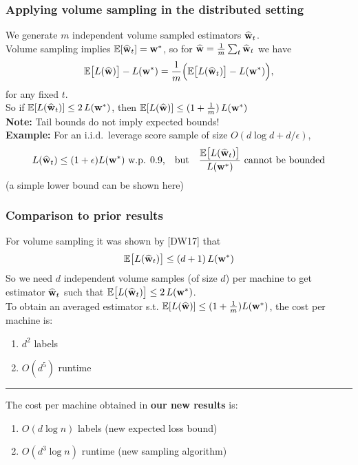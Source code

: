 \documentclass{beamer}
\begin{document}
\begin{frame}
  \frametitle{Applying volume sampling in the distributed setting}
  We generate $m$ independent volume sampled estimators $\widehat{\mathbf w}_t$.\\
Volume sampling implies $\mathbb E[\widehat{\mathbf w}_t] = \mathbf w^*$, so for $\widehat{\mathbf w} =
  \frac1m\sum_t\widehat{\mathbf w}_t$ we have
  \begin{align*}
    \mathbb E\big[L(\widehat{\mathbf w})\big] -L(\mathbf w^*) = \frac1m\Big(\mathbb E\big[L(\widehat{\mathbf w}_t)\big]
    - L(\mathbf w^*)\Big),
  \end{align*}
  for any fixed $t$.\\[2mm]
  So if $\mathbb E[L(\widehat{\mathbf w}_t)]\leq 2\,L(\mathbf w^*)$, then $\mathbb E[L(\widehat{\mathbf w})]\leq
  (1+\frac1m)\,L(\mathbf w^*)$\\[5mm]
  
  \textbf{Note:} Tail bounds do not imply expected bounds!\\
  \textbf{Example:} For an i.i.d.~leverage score sample of size
  $O(d\log d+d/\epsilon)$, 
  \begin{align*}
L(\widehat{\mathbf w}_t)\leq (1+\epsilon) L(\mathbf w^*)\text{ w.p. 0.9,\quad but}\quad
    \frac{\mathbb E\big[L(\widehat{\mathbf w}_t)\big]}{L(\mathbf w^*)} \text{ cannot be bounded}
  \end{align*}
  (a simple lower bound can be shown here)
\end{frame}

\begin{frame}
  \frametitle{Comparison to prior results}
  For volume sampling it was shown by [DW17] that
  \begin{align*}
    \mathbb E\big[L(\widehat{\mathbf w}_t)\big]\leq (d+1)\,L(\mathbf w^*)
  \end{align*}
So we need $d$ independent volume samples (of size $d$) per machine to
get estimator $\widehat{\mathbf w}_t$ such that $\mathbb E\big[L(\widehat{\mathbf w}_t)\big]\leq
2\,L(\mathbf w^*)$.\\[3mm] 
To obtain an averaged estimator s.t. $\mathbb E[L(\widehat{\mathbf w})]\leq
(1+\frac1m)L(\mathbf w^*)$, the cost per machine is:
\begin{enumerate}
\item $d^2$ labels
\item $ O(d^5)$ runtime
\end{enumerate}
\vspace{5mm}
\hrule
\vspace{6mm}

The cost per machine obtained in \textbf{our new results} is:
\begin{enumerate}
\item $O(d\log n)$ labels \qquad (new expected loss bound)
  \item $O(d^3\log n)$ runtime \qquad (new sampling algorithm)
\end{enumerate}
\end{frame}
\end{document}
